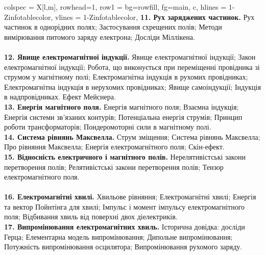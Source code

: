 \documentclass{Syllabus}
\begin{document}
\begin{longtblr}[
	]{
	colspec = {X[l,m]},
    rowhead=1,
	row{1} = {bg=rowfill, fg=main,  c},
	hlines = {1-Z}{infotablecolor},
	vlines = {1-Z}{infotablecolor},
	}
	\textbf{11. Рух заряджених частинок.}\newline
    Рух частинок в однорідних полях; Застосування схрещених полів; Методи вимірювання питомого заряду електрона; Досліди Міллікена.
    \\
    \\
	\textbf{12. Явище електромагнітної індукції.}\newline
    Явище електромагнітної індукції; Закон електромагнітної індукції; Робота, що виконується при переміщенні провідника зі струмом у магнітному полі; Електромагнітна індукція в рухомих провідниках; Електромагнітна індукція в нерухомих провідниках; Явище самоіндукції; Індукція в надпровідниках. Ефект Мейснера.
    \\
	\textbf{13. Енергія магнітного поля.}\newline
    Енергія магнітного поля; Взаємна індукція; Енергія системи зв’язаних контурів; Потенціальна енергія струмів; Принцип роботи трансформаторів; Пондеромоторні сили в магнітному полі.
    \\
	\textbf{14. Система рівнянь Максвелла.}\newline
    Струм зміщення; Система рівнянь Максвелла; Про рівняння Максвелла; Енергія електромагнітного поля; Скін-ефект.
    \\
	\textbf{15. Відносність електричного і магнітного полів.}\newline
    Нерелятивістські закони перетворення полів; Релятивістські закони перетворення полів; Тензор електромагнітного поля.
    \\
    \\
	\textbf{16. Електромагнітні хвилі.}\newline
    Хвильове рівняння; Електромагнітні хвилі; Енергія та вектор Пойнтінга для хвилі; Імпульс і момент імпульсу електромагнітного поля; Відбивання хвиль від поверхні двох діелектриків.
    \\
	\textbf{17. Випромінювання електромагнітних хвиль.}\newline
    Історична довідка: досліди Герца; Елементарна модель випромінювання; Дипольне випромінювання; Потужність випромінювання осцилятора; Випромінювання рухомого заряду.

\end{longtblr}
\end{document}
